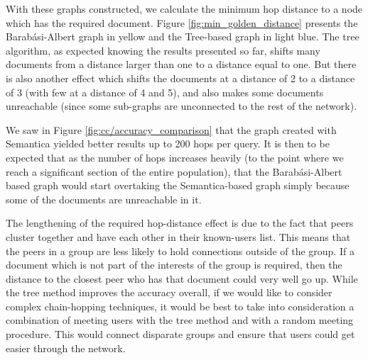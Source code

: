 \documentclass[10pt,journal]{IEEEtran}
\begin{document}
With these graphs constructed, we calculate the minimum hop distance to a node which has the required document. Figure \ref{fig:min_golden_distance} presents the Barabási-Albert graph in yellow and the Tree-based graph in light blue. The tree algorithm, as expected knowing the results presented so far, shifts many documents from a distance larger than one to a distance equal to one. But there is also another effect which shifts the documents at a distance of 2 to a distance of 3 (with few at a distance of 4 and 5), and also makes some documents unreachable (since some sub-graphs are unconnected to the rest of the network). 

We saw in Figure \ref{fig:cc/accuracy_comparison} that the graph created with Semantica yielded better results up to 200 hops per query. It is then to be expected that as the number of hops increases heavily (to the point where we reach a significant section of the entire population), that the Barabási-Albert based graph would start overtaking the Semantica-based graph simply because some of the documents are unreachable in it.

The lengthening of the required hop-distance effect is due to the fact that peers cluster together and have each other in their known-users list. This means that the peers in a group are less likely to hold connections outside of the group. If a document which is not part of the interests of the group is required, then the distance to the closest peer who has that document could very well go up. While the tree method improves the accuracy overall, if we would like to consider complex chain-hopping techniques, it would be best to take into consideration a combination of meeting users with the tree method and with a random meeting procedure. This would connect disparate groups and ensure that users could get easier through the network.
\end{document}
